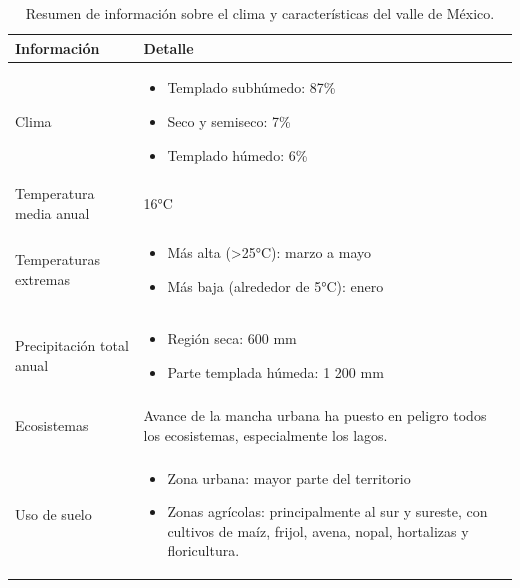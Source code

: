 \begin{enumerate}
			\begin{table}[H]
				\centering
				\caption{Resumen de información sobre el clima y características del valle de México.}\cite{weather-cdmx}
				\begin{tabular}{p{5cm}p{7cm}}
					\toprule
					\textbf{Información} & \textbf{Detalle} \\
					\midrule
				\begin{center}
					 \vspace*{0.5cm}Clima
				\end{center}	 & 
					\begin{itemize}
						\item Templado subhúmedo: 87\%
						\item Seco y semiseco: 7\%
						\item Templado húmedo: 6\%
					\end{itemize} \\
					Temperatura media anual & 16°C \\
					\begin{center}
						\vspace*{0.5cm} Temperaturas extremas
					\end{center}	
					 & 
					\begin{itemize}
						\item Más alta (>25°C): marzo a mayo
						\item Más baja (alrededor de 5°C): enero
					\end{itemize} \\
					\begin{center}
						\vspace*{0.5cm}Precipitación total anual
					\end{center}	
					 & 
					\begin{itemize}
						\item Región seca: 600 mm
						\item Parte templada húmeda: 1 200 mm
					\end{itemize} \\
					\begin{center}
						\vspace*{0.5cm}Ecosistemas
					\end{center}	 & Avance de la mancha urbana ha puesto en peligro todos los ecosistemas, especialmente los lagos. \\
					\begin{center}
						\vspace*{1.2cm}Uso de suelo
					\end{center}	 & 
					\begin{itemize}
						\item Zona urbana: mayor parte del territorio
						\item Zonas agrícolas: principalmente al sur y sureste, con cultivos de maíz, frijol, avena, nopal, hortalizas y floricultura.
					\end{itemize} \\
					\bottomrule
				\end{tabular}
				\label{tabla:clima}
			\end{table}
		 

\end{enumerate}
